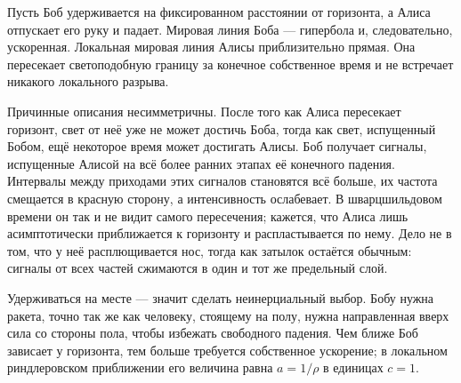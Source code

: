 Пусть Боб удерживается на фиксированном расстоянии от горизонта, а Алиса отпускает его руку и падает. Мировая линия Боба — гипербола и, следовательно, ускоренная. Локальная мировая линия Алисы приблизительно прямая. Она пересекает светоподобную границу за конечное собственное время и не встречает никакого локального разрыва.

Причинные описания несимметричны. После того как Алиса пересекает горизонт, свет от неё уже не может достичь Боба, тогда как свет, испущенный Бобом, ещё некоторое время может достигать Алисы. Боб получает сигналы, испущенные Алисой на всё более ранних этапах её конечного падения. Интервалы между приходами этих сигналов становятся всё больше, их частота смещается в красную сторону, а интенсивность ослабевает. В шварцшильдовом времени он так и не видит самого пересечения; кажется, что Алиса лишь асимптотически приближается к горизонту и распластывается по нему. Дело не в том, что у неё расплющивается нос, тогда как затылок остаётся обычным: сигналы от всех частей сжимаются в один и тот же предельный слой.

\begin{classroomqa}
\end{classroomqa}

\begin{classroomqa}
\end{classroomqa}

Удерживаться на месте — значит сделать неинерциальный выбор. Бобу нужна ракета, точно так же как человеку, стоящему на полу, нужна направленная вверх сила со стороны пола, чтобы избежать свободного падения. Чем ближе Боб зависает у горизонта, тем больше требуется собственное ускорение; в локальном риндлеровском приближении его величина равна \(a=1/\rho\) в единицах \(c=1\).

